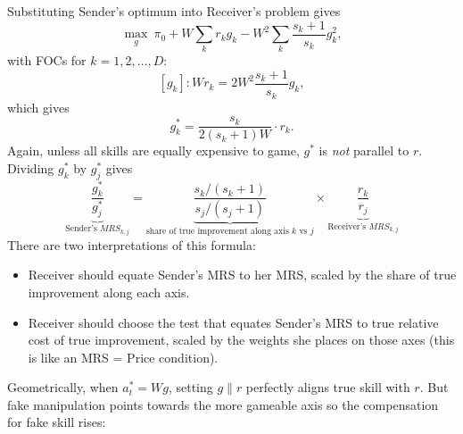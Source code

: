 \noindent
Substituting Sender's optimum into Receiver's problem gives $$\max_{g} \ \pi_0+W\sum_k r_kg_k-W^2\sum_k\dfrac{s_k+1}{s_k}g_k^2,$$ with FOCs for $k=1,2,\dots,D$:
$$[g_k]:Wr_k=2W^2\dfrac{s_k+1}{s_k}g_k,$$ which gives $$g_k^*=\dfrac{s_k}{2(s_k+1)W}\cdot r_k.$$ Again, unless all skills are equally expensive to game, $g^*$ is \textit{not} parallel to $r$.\\

Dividing $g_k^*$ by $g_j^*$ gives $$\underbrace{\dfrac{g_k^*}{g_j^*}}_{\text{Sender's } MRS_{k,j}}=\underbrace{\dfrac{s_k/(s_k+1)}{s_j/(s_j+1)}}_{\text{share of true improvement along axis } k \text{ vs } j} \times\underbrace{\dfrac{r_k}{r_j}}_{\text{Receiver's } MRS_{k,j}}$$ There are two interpretations of this formula:
\begin{itemize}[nosep]
    \item Receiver should equate Sender's MRS to her MRS, scaled by the share of true improvement along each axis.
    \item Receiver should choose the test that equates Sender's MRS to true relative cost of true improvement, scaled by the weights she places on those axes (this is like an MRS = Price condition).\\
\end{itemize}

\noindent Geometrically, when $a_t^*=Wg$, setting $g\parallel r$ perfectly aligns true skill with $r$. But fake manipulation points towards the more gameable axis so the compensation for fake skill rises:


